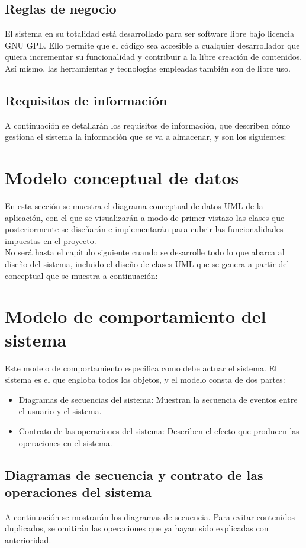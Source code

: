 \subsection{Reglas de negocio}

El sistema en su totalidad está desarrollado para ser software libre bajo licencia GNU GPL. Ello permite que el código sea accesible a cualquier desarrollador que quiera incrementar su funcionalidad y contribuir a la libre creación de contenidos. Así mismo, las herramientas y tecnologías empleadas también son de libre uso.

\subsection{Requisitos de información}

A continuación se detallarán los requisitos de información, que describen cómo gestiona el sistema la información que se va a almacenar, y son los siguientes:

\section{Modelo conceptual de datos}

En esta sección se muestra el diagrama conceptual de datos UML de la aplicación, con el que se visualizarán a modo de primer vistazo las clases que posteriormente se diseñarán e implementarán para cubrir las funcionalidades impuestas en el proyecto.\\

No será hasta el capítulo siguiente cuando se desarrolle todo lo que abarca al diseño del sistema, incluido el diseño de clases UML que se genera a partir del conceptual que se muestra a continuación:

\section{Modelo de comportamiento del sistema}

Este modelo de comportamiento especifica como debe actuar el sistema. El sistema es el que engloba todos los objetos, y el modelo consta de dos partes:

\begin{itemize}
\item Diagramas de secuencias del sistema: Muestran la secuencia de eventos entre el usuario y el sistema.
\item Contrato de las operaciones del sistema: Describen el efecto que producen las operaciones en el sistema.
\end{itemize}

\subsection{Diagramas de secuencia y contrato de las operaciones del sistema}

A continuación se mostrarán los diagramas de secuencia. Para evitar contenidos duplicados, se omitirán las operaciones que ya hayan sido explicadas con anterioridad.














